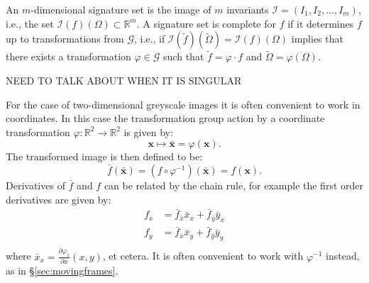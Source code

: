 \documentclass[review,onefignum,onetabnum]{siamonline190516}
\begin{document}
An $m$-dimensional signature set is the image of $m$ invariants $\mathcal{I}=(I_1,I_2,\dots,I_m)$, i.e., the set $\mathcal{I}(f)(\Omega)\subset \mathbb{R}^m$.  A signature set is complete for $f$ if it determines $f$ up to transformations from $\mathcal{G}$, i.e., if $\mathcal{I}(\tilde f)(\tilde\Omega) = \mathcal{I}(f)(\Omega)$ implies that there exists a transformation $\varphi\in \mathcal{G}$ such that $\tilde f = \varphi\cdot f$ and $\tilde \Omega = \varphi(\Omega)$. 

NEED TO TALK ABOUT WHEN IT IS SINGULAR

For the case of two-dimensional greyscale images it is often convenient to work in coordinates. In this case the transformation group action by a coordinate transformation $\varphi \colon \mathbb{R}^2 \to \mathbb{R}^2$ is given by:
\begin{equation}\label{eq:transformation}
  \mathbf{x} \mapsto \bar{\mathbf{x}} = \varphi(\mathbf{x}).
\end{equation}
The transformed image is then defined to be:
\begin{equation}\label{eq:fbarequalsf}
  \bar{f}(\bar{\mathbf{x}}) = (f\circ\varphi^{-1})(\bar{\mathbf{x}}) = f(\mathbf{x}).
\end{equation}
Derivatives of $\bar{f}$ and $f$ can be related by the chain rule, for example the first order derivatives are given by:
\begin{equation}\label{eq:prolongation}
  \begin{aligned}
    f_x &= \bar{f}_{\bar{x}} \bar{x}_x + \bar{f}_{\bar{y}}\bar{y}_x \\
    f_y &= \bar{f}_{\bar{x}} \bar{x}_y + \bar{f}_{\bar{y}}\bar{y}_y \\
  \end{aligned}
\end{equation}
where $\bar{x}_x = \frac{\partial \varphi_1}{\partial x}(x, y)$, et cetera. It is often convenient to work with $\varphi^{-1}$ instead, as in \S\ref{sec:movingframes}.
\end{document}
